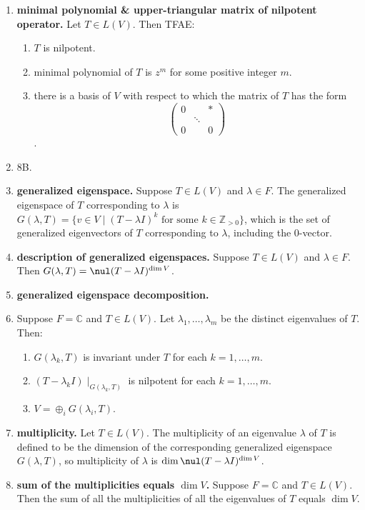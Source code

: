 \begin{enumerate}
	\item \textbf{minimal polynomial \& upper-triangular matrix of nilpotent operator. } Let $T \in L(V)$. Then TFAE: 
	\begin{enumerate}
		\item $T$ is nilpotent. 
		\item minimal polynomial of $T$ is $z^m$ for some positive integer $m$. 
		\item there is a basis of $V$ with respect to which the matrix of $T$ has the form
		$$
		\begin{pmatrix}
		0 & & * \\
		 & \ddots & \\
		0 & & 0
		\end{pmatrix}
		$$. 
	\end{enumerate}
	\item 8B. 
	\item \textbf{generalized eigenspace. } Suppose $T \in L(V)$ and $\lambda \in F$. The generalized eigenspace of $T$ corresponding to $\lambda$ is $G(\lambda, T) = \{v \in V \mid (T - \lambda I)^k \textrm{ for some } k \in \mathbb{Z}_{>0}\}$, which is the set of generalized eigenvectors of $T$ corresponding to $\lambda$, including the 0-vector. 
	\item \textbf{description of generalized eigenspaces. } Suppose $T \in L(V)$ and $\lambda \in F$. Then $G(\lambda, T) = \nul(T - \lambda I)^{\dim V}$. 
	\item \textbf{generalized eigenspace decomposition. } 
	\item Suppose $F = \mathbb{C}$ and $T \in L(V)$. Let $\lambda_1,\dots,\lambda_m$ be the distinct eigenvalues of $T$. Then: 
	\begin{enumerate}
		\item $G(\lambda_k,T)$ is invariant under $T$ for each $k=1,\dots,m$. 
		\item $(T - \lambda_k I) \mid_{G(\lambda_k, T)}$ is nilpotent for each $k=1,\dots,m$. 
		\item $V = \oplus_i G(\lambda_i, T)$. 
	\end{enumerate}
	\item \textbf{multiplicity. } Let $T \in L(V)$. The multiplicity of an eigenvalue $\lambda$ of $T$ is defined to be the dimension of the corresponding generalized eigenspace $G(\lambda, T)$, so multiplicity of $\lambda$ is $\dim \nul(T - \lambda I)^{\dim V}$. 
	\item \textbf{sum of the multiplicities equals $\dim V$. } Suppose $F=\mathbb{C}$ and $T \in L(V)$. Then the sum of all the multiplicities of all the eigenvalues of $T$ equals $\dim V$. 

\end{enumerate}
